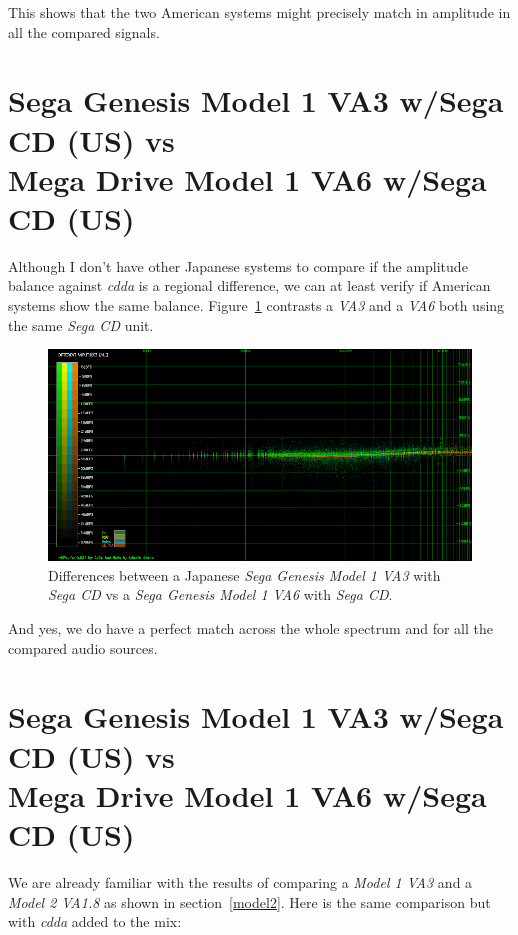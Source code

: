 \documentclass[10pt,a4paper]{report}
\newcommand{\ac}[1]{\textit{\mbox{\acrshort{#1}}}}
\begin{document}
This shows that the two American systems might precisely match in amplitude in all the compared signals.

\section{Sega Genesis Model 1 VA3 w/Sega CD (US) vs\\ Mega Drive Model 1 VA6 w/Sega CD (US)}

Although I don't have other Japanese systems to compare if the amplitude balance against \ac{cdda} is a regional difference, we can at least verify if American systems show the same balance. Figure~\ref{fig:A-MD1UTVA3-SCD-LA_vs_A-MD1UJVA6-SCDD} contrasts a \textit{VA3} and a \textit{VA6} both using the same \textit{Sega CD} unit.

\begin{figure}[H]
	\centering
	\includegraphics[width=1.0\linewidth]{images/results/12-A-MD1UTVA3-SCD-LA_vs_A-MD1UJVA6-SCD.png}
	\caption[A-MD1UTVA3-SCD-LA vs A-MD1UJVA6-SCD]{Differences between a Japanese  \textit{Sega Genesis Model 1 VA3} with \textit{Sega CD} vs a \textit{Sega Genesis Model 1 VA6} with \textit{Sega CD}.}
	\label{fig:A-MD1UTVA3-SCD-LA_vs_A-MD1UJVA6-SCDD}
\end{figure}

And yes, we do have a perfect match across the whole spectrum and for all the compared audio sources.

\section{Sega Genesis Model 1 VA3 w/Sega CD (US) vs\\ Mega Drive Model 1 VA6 w/Sega CD (US)}

We are already familiar with the results of comparing a \textit{Model 1 VA3} and a \textit{Model 2 VA1.8} as shown in section~\ref{model2}. Here is the same comparison but with \ac{cdda} added to the mix:
\end{document}
